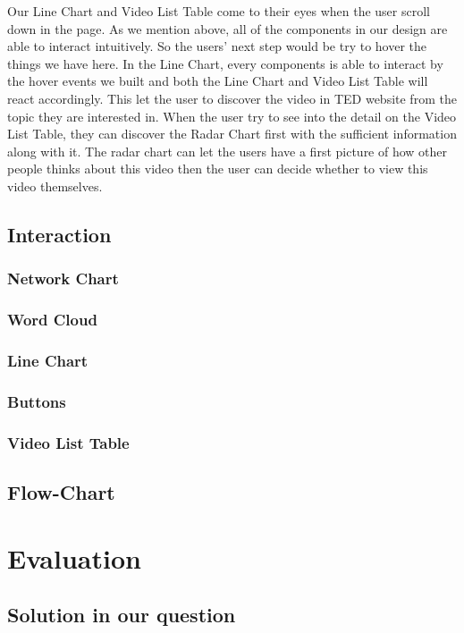 \documentclass{report}
\numberwithin{figure}{section}
\begin{document}
Our Line Chart and Video List Table come to their eyes when the user scroll down in the page. As we mention above, all of the components in our design are able to interact intuitively. So the users' next step would be try to hover the things we have here. In the Line Chart, every components is able to interact by the hover events we built and both the Line Chart and Video List Table will react accordingly. This let the user to discover the video in TED website from the topic they are interested in. When the user try to see into the detail on the Video List Table, they can discover the Radar Chart first with the sufficient information along with it. The radar chart can let the users have a first picture of how other people thinks about this video then the user can decide whether to view this video themselves.

\section{Interaction}
\subsection{Network Chart}
\subsection{Word Cloud}
\subsection{Line Chart}
\subsection{Buttons}
\subsection{Video List Table}

\section{Flow-Chart}

\chapter{Evaluation}
\section{Solution in our question}
 


\end{document}
